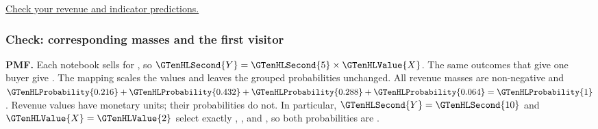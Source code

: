 \par\smallskip\noindent\hyperref[check:sale-comparisons]{Check your revenue and indicator predictions.}
\subsubsection*{Check: corresponding masses and the first visitor}\label{check:sale-comparisons}
\textbf{ PMF.} Each notebook sells for , so $\GTenHLSecond{Y}=\GTenHLSecond{5}\times\GTenHLValue{X}$. The same outcomes that give one buyer give . The mapping scales the values and leaves the grouped probabilities unchanged.
All revenue masses are non-negative and $\GTenHLProbability{0.216}+\GTenHLProbability{0.432}+\GTenHLProbability{0.288}+\GTenHLProbability{0.064}=\GTenHLProbability{1}$. Revenue values have monetary units; their probabilities do not. In particular, $\GTenHLSecond{Y}=\GTenHLSecond{10}$ and $\GTenHLValue{X}=\GTenHLValue{2}$ select exactly , , and , so both probabilities are .

